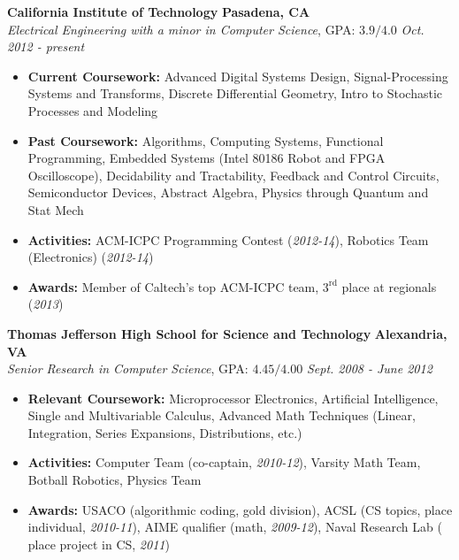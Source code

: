 \documentclass{article}
\newenvironment{changemargin}[2]{%
  \begin{list}{}{%
    \setlength{\topsep}{0pt}%
    \setlength{\leftmargin}{#1}%
    \setlength{\rightmargin}{#2}%
    \setlength{\listparindent}{\parindent}%
    \setlength{\itemindent}{\parindent}%
    \setlength{\parsep}{\parskip}%
  }%
  \item[]}{\end{list}
}
\newenvironment{body} {
	\vspace*{-16pt}
	\begin{changemargin}{-0.25in}{-0.5in}
  }	
	{\end{changemargin}
}
\begin{document}
\begin{body}
	\vspace{14pt}
	\textbf{California Institute of Technology} \hfill \textbf{Pasadena, CA}{} \\
	\emph{Electrical Engineering with a minor in Computer Science}, GPA: $3.9/4.0$ \hfill \emph{Oct. 2012 - present} \\
	\begin{itemize}
	\item \textbf{Current Coursework:} Advanced Digital Systems Design, Signal-Processing Systems and Transforms, Discrete Differential Geometry, Intro to Stochastic Processes and Modeling
	\item \textbf{Past Coursework:} Algorithms, Computing Systems, Functional Programming, Embedded Systems (Intel 80186 Robot and FPGA Oscilloscope), Decidability and Tractability, Feedback and Control Circuits, Semiconductor Devices, Abstract Algebra, Physics through Quantum and Stat Mech
	\item \textbf{Activities:} ACM-ICPC Programming Contest (\textit{2012-14}), Robotics Team (Electronics) (\textit{2012-14})
	\item \textbf{Awards:} Member of Caltech's top ACM-ICPC team, $3^\text{rd}$ place at regionals (\textit{2013})
	\end{itemize}

	\medskip

	\textbf{Thomas Jefferson High School for Science and Technology} \hfill \textbf{Alexandria, VA} \\
	\emph{Senior Research in Computer Science}, GPA: $4.45/4.00$ \hfill \emph{Sept. 2008 - June 2012} \\
	\begin{itemize}
	\item \textbf{Relevant Coursework:} Microprocessor Electronics, Artificial Intelligence, Single and Multivariable Calculus, Advanced Math Techniques (Linear, Integration, Series Expansions, Distributions, etc.)
	\item \textbf{Activities:} Computer Team (co-captain, \textit{2010-12}), Varsity Math Team, Botball Robotics, Physics Team
	\item \textbf{Awards:} USACO (algorithmic coding, gold division), ACSL (CS topics,  place individual, \textit{2010-11}), AIME qualifier (math, \textit{2009-12}), Naval Research Lab ( place project in CS, \textit{2011})
	\end{itemize}
\end{body}
\end{document}
